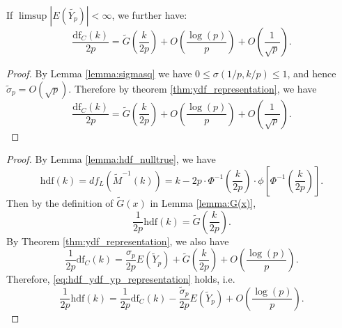 \begin{corollary}
	\label{corollary:Yp_order}
	If $\limsup |E(\tilde{Y_p})| < \infty$, we further have:
	\begin{equation}
	\frac{\text{df}_C(k)}{2p} = \tilde{G}(\frac{k}{2p}) + O\left(\frac{\log(p)}{p}\right) + O\left(\frac{1}{\sqrt{p}}\right).
	\label{eq:ydf/2p_representation_remark}
	\end{equation}
\end{corollary}
\begin{proof}
	By Lemma \ref{lemma:sigmasq} we have $0 \le \sigma(1/p,k/p) \le 1$, and hence $\tilde{\sigma}_p = O(\sqrt{p})$. Therefore by theorem \ref{thm:ydf_representation}, we have
	\begin{equation*}
	\frac{\text{df}_C(k)}{2p}=  \tilde{G}(\frac{k}{2p}) + O\left( \frac{\log(p)}{p}\right) + O\left(\frac{1}{\sqrt{p}}\right).
	\end{equation*}	
\end{proof}

\dfasy*

\begin{proof}
	By Lemma \ref{lemma:hdf_nulltrue}, we have
	\begin{equation*}
	\text{hdf}(k) = df_L(\tilde{M}^{-1}(k)) = k - 2p\cdot \Phi^{-1} (\frac{k}{2p}) \cdot \phi\left[\Phi^{-1}(\frac{k}{2p}) \right].
	\end{equation*}
	Then by the definition of $\tilde{G}(x)$ in Lemma \ref{lemma:G(x)},
	\begin{equation*}
	\frac{1}{2p} \text{hdf}(k) = \tilde{G}(\frac{k}{2p}).
	\end{equation*}
	By Theorem \ref{thm:ydf_representation}, we also have
	\begin{equation*}
	\frac{1}{2p}\text{df}_C(k) = \frac{\sigma_p}{2p}E(\tilde{Y}_p) + \tilde{G}(\frac{k}{2p}) + O\left(\frac{\log(p)}{p} \right).
	\end{equation*}
	Therefore, \eqref{eq:hdf_ydf_yp_representation} holds, i.e.
	\begin{equation*}
	\frac{1}{2p} \text{hdf}(k) = \frac{1}{2p}\text{df}_C(k) - \frac{\tilde{\sigma}_p}{2p}E(\tilde{Y}_p) + O\left(\frac{\log(p)}{p} \right).
	\end{equation*}
\end{proof}

